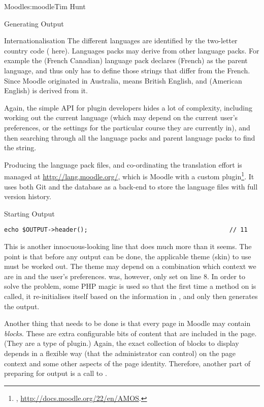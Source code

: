 \begin{aosachapter}{Moodle}{s:moodle}{Tim Hunt}
\begin{aosasect1}{Generating Output}
\begin{aosasect2}{Internationalisation}
The different languages are identified by the two-letter country code
( here). Languages packs may derive from other language
packs. For example the  (French Canadian) language pack
declares  (French) as the parent language, and thus only has
to define those strings that differ from the French. Since Moodle
originated in Australia,  means British English, and
 (American English) is derived from it.

Again, the simple  API for plugin developers hides a
lot of complexity, including working out the current language (which
may depend on the current user's preferences, or the settings for the
particular course they are currently in), and then searching through
all the language packs and parent language packs to find the string.

Producing the language pack files, and co-ordinating the translation
effort is managed at \url{http://lang.moodle.org/}, which is Moodle
with a custom plugin\footnote{,
  \url{http://docs.moodle.org/22/en/AMOS}.}. It uses both Git and the
database as a back-end to store the language files with full version
history.

\end{aosasect2}

\begin{aosasect2}{Starting Output}

\begin{verbatim}
echo $OUTPUT->header();                                       // 11
\end{verbatim}

This is another innocuous-looking line that does much more than it
seems. The point is that before any output can be done, the applicable
theme (skin) to use must be worked out. The theme may depend on a
combination which context we are in and the user's
preferences.  was, however, only
set on line 8. In order to solve the problem, some PHP magic is used
so that the first time a method on  is called, it
re-initialises itself based on the information in , and
only then generates the output.

Another thing that needs to be done is that every page in Moodle may
contain \emph{blocks}. These are extra configurable bits of content
that are included in the page. (They are a type of plugin.) Again, the
exact collection of blocks to display depends in a flexible way (that
the administrator can control) on the page context and some other
aspects of the page identity. Therefore, another part of preparing for
output is a call to
.


\end{aosasect2}
\end{aosasect1}
\end{aosachapter}
